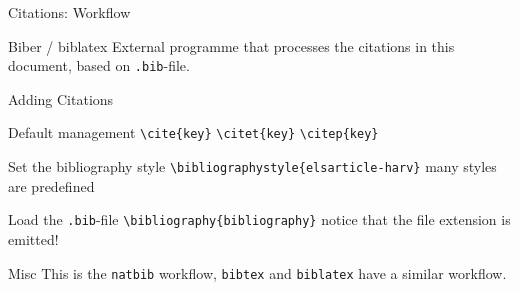 \documentclass[final,aspectratio=43]{beamer}
\begin{document}
\begin{frame}{Citations: Workflow}
\begin{block}{Biber / biblatex}
    External programme that processes the citations in this document, based on \texttt{.bib}-file.
\end{block}



\end{frame}


\begin{frame}[fragile]{Adding Citations}
    \begin{block}{Default management}
        \texttt{\textbackslash cite\{key\}} \texttt{\textbackslash citet\{key\}} \texttt{\textbackslash citep\{key\}}
    \end{block}
    
    \begin{block}{Set the bibliography style}
        \texttt{\textbackslash bibliographystyle\{elsarticle-harv\}} many styles are predefined
    \end{block}
    
    \begin{block}{Load the \texttt{.bib}-file}
        \texttt{\textbackslash bibliography\{bibliography\}} notice that the file extension is emitted!
    \end{block}
    

    \begin{block}{Misc}
        This is the \texttt{natbib} workflow, \texttt{bibtex} and \texttt{biblatex} have a similar workflow.
    \end{block}
\end{frame}
\end{document}
